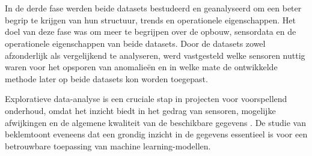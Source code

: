 


\section{}%
\label{sec: vergelijkende data-analyse van de beide datasets}

In de derde fase werden beide datasets bestudeerd en geanalyseerd om een beter begrip te krijgen van hun structuur, trends en operationele eigenschappen. Het doel van deze fase was om meer te begrijpen over de opbouw, sensordata en de operationele eigenschappen van beide datasets. Door de datasets zowel afzonderlijk als vergelijkend te analyseren, werd vastgesteld welke sensoren nuttig waren voor het opsporen van anomalieën en in welke mate de ontwikkelde methode later op beide datasets kon worden toegepast.

Exploratieve data-analyse is een cruciale stap in projecten voor voorspellend onderhoud, omdat het inzicht biedt in het gedrag van sensoren, mogelijke afwijkingen en de algemene kwaliteit van de beschikbare gegevens \autocite{Carvalho2019}. De studie van \textcite{Elahi2023} beklemtoont eveneens dat een grondig inzicht in de gegevens essentieel is voor een betrouwbare toepassing van machine learning-modellen.

